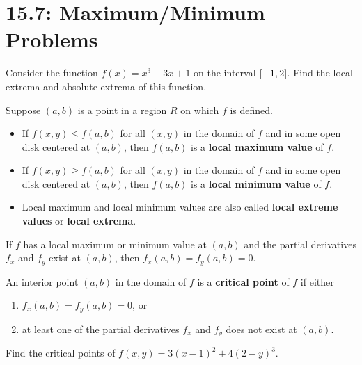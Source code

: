 \documentclass[mathNotesPreamble]{subfiles}
\begin{document}
\section{15.7: Maximum/Minimum Problems}
  \begin{ex*}
    Consider the function $f(x)=x^3-3x+1$ on the interval ${\left[-1,2\right]}$. Find the local extrema and absolute extrema of this function.
  \end{ex*}

  \begin{defn*}
    Suppose $(a,b)$ is a point in a region $R$ on which $f$ is defined. 
    \begin{itemize}
      \item 
        If $f(x,y)\leq f(a,b)$ for all $(x,y)$ in the domain of $f$ and in some open disk centered at $(a,b)$, then $f(a,b)$ is a \textbf{local maximum value} of $f$.
      \item 
        If $f(x,y)\geq f(a,b)$ for all $(x,y)$ in the domain of $f$ and in some open disk centered at $(a,b)$, then $f(a,b)$ is a \textbf{local minimum value} of $f$.
      \item 
        Local maximum and local minimum values are also called \textbf{local extreme values} or \textbf{local extrema}.
    \end{itemize}
  \end{defn*}
  \pagebreak

  \begin{thmBox*}
    If $f$ has a local maximum or minimum value at $(a,b)$ and the partial derivatives $f_x$ and $f_y$ exist at $(a,b)$, then $f_x(a,b)=f_y(a,b)=0$.
  \end{thmBox*}

  \begin{defn*}
    An interior point $(a,b)$ in the domain of $f$ is a \textbf{critical point} of $f$ if either
    \begin{enumerate}
      \item 
        $f_x(a,b)=f_y(a,b)=0$, or
      \item 
        at least one of the partial derivatives $f_x$ and $f_y$ does not exist at $(a,b)$.
    \end{enumerate}
  \end{defn*}

  \begin{ex*}
    Find the critical points of $f(x,y)=3(x-1)^2+4(2-y)^3$.
  \end{ex*}
\end{document}
